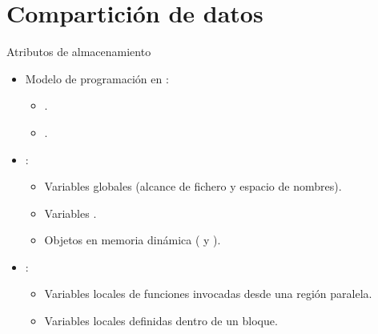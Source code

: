 \section{Compartición de datos}

\begin{frame}[t]{Atributos de almacenamiento}
\begin{itemize}
  \item Modelo de programación en :
    \begin{itemize}
      \item {}.
      \item {}.
    \end{itemize}

  \item {}:
    \begin{itemize}
      \item Variables globales (alcance de fichero y espacio de nombres).
      \item Variables .
      \item Objetos en memoria dinámica ( y ).
    \end{itemize}

  \item {}:
    \begin{itemize}
      \item Variables locales de funciones invocadas desde una región paralela.
      \item Variables locales definidas dentro de un bloque.
    \end{itemize}
\end{itemize}
\end{frame}

